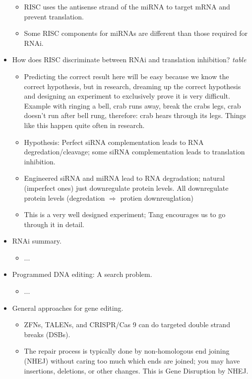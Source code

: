 \documentclass[../notes.tex]{subfiles}
\begin{document}
\begin{itemize}
\begin{itemize}
        \item RISC uses the antisense strand of the miRNA to target mRNA and prevent translation.
        \item Some RISC components for miRNAs are different than those required for RNAi.
    \end{itemize}
    \item How does RISC discriminate between RNAi and translation inhibition?
    \emph{table}
    \begin{itemize}
        \item Predicting the correct result here will be easy because we know the correct hypothesis, but in research, dreaming up the correct hypothesis and designing an experiment to exclusively prove it is very difficult. Example with ringing a bell, crab runs away, break the crabs legs, crab doesn't run after bell rung, therefore: crab hears through its legs. Things like this happen quite often in research.
        \item Hypothesis: Perfect siRNA complementation leads to RNA degredation/cleavage; some siRNA complementation leads to translation inhibition.
        \item Engineered siRNA and miRNA lead to RNA degradation; natural (imperfect ones) just downregulate protein levels. All downregulate protein levels (degredation $\Rightarrow$ protien downreuglation)
        \item This is a very well designed experiment; Tang encourages us to go through it in detail.
    \end{itemize}
    \item RNAi summary.
    \begin{itemize}
        \item ...
    \end{itemize}
    \item Programmed DNA editing: A search problem.
    \begin{itemize}
        \item ...
    \end{itemize}
    \item General approaches for gene editing.
    \begin{itemize}
        \item ZFNs, TALENs, and CRISPR/Cas 9 can do targeted double strand breaks (DSBs).
        \item The repair process is typically done by non-homologous end joining (NHEJ) without caring too much which ends are joined; you may have insertions, deletions, or other changes. This is Gene Disruption by NHEJ.

\end{itemize}
\end{itemize}
\end{document}
